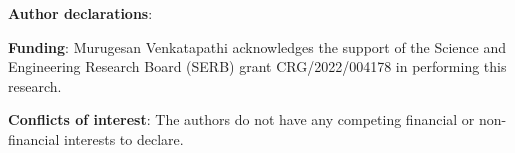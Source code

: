 \documentclass[onefignum,onetabnum]{siamart171218}
\begin{document}
\vspace{3mm}
\noindent \textbf{Author declarations}:

\vspace{3mm}
\noindent \textbf{Funding}: Murugesan Venkatapathi acknowledges the support of the Science and Engineering Research Board (SERB) grant CRG/2022/004178 in performing this research.

\vspace{3mm}
\noindent \textbf{Conflicts of interest}: The authors do not have any competing financial or non-financial interests to declare.



\end{document}
